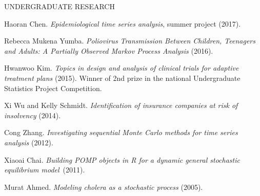 \begin{reflist}{UNDERGRADUATE RESEARCH}
\item{Haoran Chen}. {\em Epidemiological time series analysis}, summer project (2017).
\item{Rebecca Mukena Yumba}.  {\em Poliovirus Transmission Between Children, Teenagers and Adults: A Partially Observed Markov Process Analysis} (2016).
\item{Hwanwoo Kim}. {\em Topics in design and analysis of clinical trials for adaptive treatment plans} (2015). Winner of 2nd prize in the national Undergraduate Statistics Project Competition.
\item{Xi Wu and Kelly Schmidt}. {\em Identification of insurance companies at risk of insolvency} (2014).
\item{Cong Zhang}. {\em Investigating sequential Monte Carlo methods for time series analysis} (2012).
\item{Xiaoai Chai}. {\em Building POMP objects in R for a dynamic general stochastic equilibrium model}~(2011).  
\item{Murat Ahmed}. {\em Modeling cholera as a stochastic process} (2005).

\end{reflist}



\lsp







